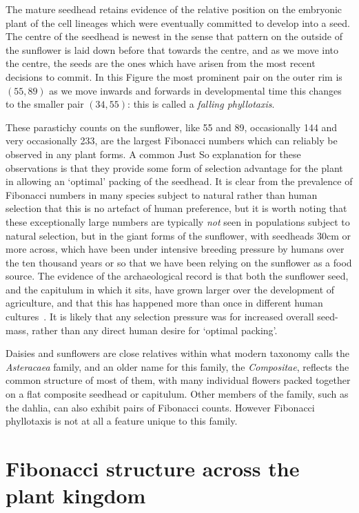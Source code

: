 The mature seedhead retains evidence of the relative position on the embryonic plant of the cell lineages which were eventually committed to develop into a seed. The centre of the seedhead is newest in the sense that pattern on the outside of the sunflower is laid down before that towards the centre, and as we move into the centre, the seeds are the ones which have arisen from the most recent decisions to commit. In this Figure the most prominent pair on the outer rim is $({55,89})$  as we move inwards and forwards in developmental time this changes to the smaller pair $({34,55})$: this is called a \textit{falling phyllotaxis}. 

These parastichy counts on the sunflower, like 55 and 89,  occasionally 144 and very occasionally 233, are the largest Fibonacci numbers which can reliably be observed in any plant forms. A common Just So explanation for these observations is that they provide some form of selection advantage for the plant in allowing an `optimal' packing of the seedhead. It is clear from the prevalence  of Fibonacci numbers in many species subject to natural rather than human selection that  this is no  artefact of human preference, but it is worth noting  that these exceptionally large numbers are typically \textit{not} seen in populations subject to natural selection, but in the giant forms of the sunflower, with seedheads 30cm or more across, which have been under intensive breeding pressure by humans over the ten thousand years or so that we have been relying on the sunflower as a food source. 
The evidence of the archaeological record is that both
 the sunflower seed, and the capitulum in which it sits, have grown larger over the development of agriculture, and that this has happened more than once in different human cultures~\autocite{lentzSunflowerHelianthusAnnuus2008,burkeGeneticAnalysisSunflower2002}. It is likely that any selection pressure was for increased overall seed-mass, rather than any direct human desire for `optimal packing'. 
 
  Daisies and sunflowers are close relatives within what modern taxonomy calls the \textit{Asteracaea} family,  and an older name for this family, the \textit{Compositae}, reflects the common structure of most of them, with many individual flowers packed together on a flat composite seedhead or capitulum. Other members of the family, such as the dahlia, can also exhibit pairs of Fibonacci counts.
 However Fibonacci phyllotaxis is not at all a feature unique to this family.
 

\section{Fibonacci structure across the plant kingdom}

